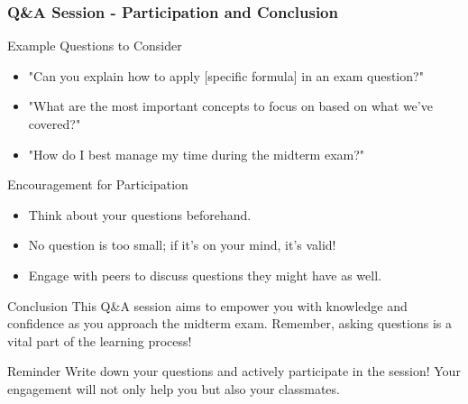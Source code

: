 \documentclass{beamer}
\begin{document}
\begin{frame}[fragile]
    \frametitle{Q\&A Session - Participation and Conclusion}
    \begin{block}{Example Questions to Consider}
        \begin{itemize}
            \item "Can you explain how to apply [specific formula] in an exam question?"
            \item "What are the most important concepts to focus on based on what we've covered?"
            \item "How do I best manage my time during the midterm exam?"
        \end{itemize}
    \end{block}

    \begin{block}{Encouragement for Participation}
        \begin{itemize}
            \item Think about your questions beforehand.
            \item No question is too small; if it’s on your mind, it’s valid!
            \item Engage with peers to discuss questions they might have as well.
        \end{itemize}
    \end{block}

    \begin{block}{Conclusion}
        This Q\&A session aims to empower you with knowledge and confidence as you approach the midterm exam. Remember, asking questions is a vital part of the learning process!
    \end{block}

    \begin{block}{Reminder}
        Write down your questions and actively participate in the session! Your engagement will not only help you but also your classmates.
    \end{block}
\end{frame}
\end{document}
